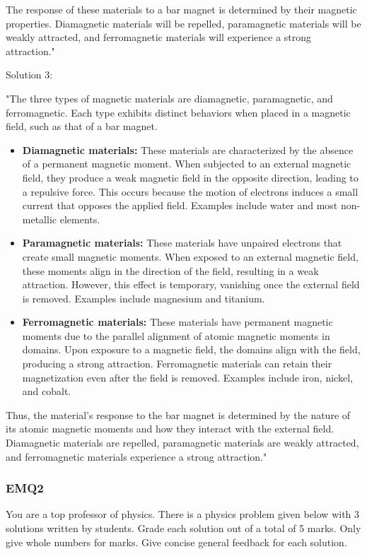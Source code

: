 The response of these materials to a bar magnet is determined by their magnetic properties. Diamagnetic materials will be repelled, paramagnetic materials will be weakly attracted, and ferromagnetic materials will experience a strong attraction."

Solution 3: 

"The three types of magnetic materials are diamagnetic, paramagnetic, and ferromagnetic. Each type exhibits distinct behaviors when placed in a magnetic field, such as that of a bar magnet.

\begin{itemize}
    \item \textbf{Diamagnetic materials:} These materials are characterized by the absence of a permanent magnetic moment. When subjected to an external magnetic field, they produce a weak magnetic field in the opposite direction, leading to a repulsive force. This occurs because the motion of electrons induces a small current that opposes the applied field. Examples include water and most non-metallic elements.
    \item \textbf{Paramagnetic materials:} These materials have unpaired electrons that create small magnetic moments. When exposed to an external magnetic field, these moments align in the direction of the field, resulting in a weak attraction. However, this effect is temporary, vanishing once the external field is removed. Examples include magnesium and titanium.
    \item \textbf{Ferromagnetic materials:} These materials have permanent magnetic moments due to the parallel alignment of atomic magnetic moments in domains. Upon exposure to a magnetic field, the domains align with the field, producing a strong attraction. Ferromagnetic materials can retain their magnetization even after the field is removed. Examples include iron, nickel, and cobalt.
\end{itemize}

Thus, the material's response to the bar magnet is determined by the nature of its atomic magnetic moments and how they interact with the external field. Diamagnetic materials are repelled, paramagnetic materials are weakly attracted, and ferromagnetic materials experience a strong attraction."

\subsubsection{EMQ2}

You are a top professor of physics. There is a physics problem given below with 3 solutions written by students. Grade each solution out of a total of 5 marks. Only give whole numbers for marks. Give concise general feedback for each solution. 

